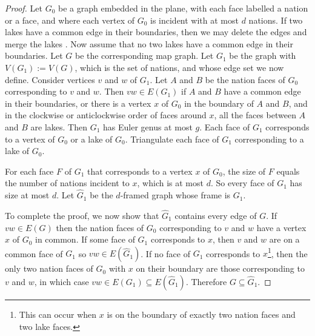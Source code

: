 \begin{proof}
  
Let $G_0$ be a graph embedded in the plane, with each face labelled a nation or a face, and where each vertex of $G_0$ is incident with at most $d$ nations. If two lakes have a common edge in their boundaries, then we may delete the edges and merge the lakes . Now assume that no two lakes have a common edge in their boundaries.
Let $G$ be the corresponding map graph.
Let $G_1$ be the graph with $V(G_1):=V(G)$, which is the set of nations, and whose edge set we now define.  Consider vertices $v$ and $w$ of $G_1$.
Let $A$ and $B$ be the nation faces of $G_0$ corresponding to $v$ and $w$.
Then $vw\in E(G_1)$ if $A$ and $B$ have a common edge in their boundaries,
or there is a vertex $x$ of $G_0$ in the boundary of $A$ and $B$, and in the clockwise or anticlockwise order of faces around $x$, all the faces between $A$ and $B$ are lakes.
 Then $G_1$ has Euler genus at most $g$.
Each face of $G_1$ corresponds to a vertex of $G_0$ or a lake of $G_0$.
Triangulate each face of $G_1$ corresponding to a lake of $G_0$.

For each face $F$ of $G_1$ that corresponds to a vertex $x$ of $G_0$, the size of $F$  equals the number of nations incident to $x$, which is at most $d$. So every face of $G_1$ has size at most $d$.  Let $\widehat{G}_1$ be the $d$-framed graph whose frame is $G_1$.   

To complete the proof, we now show that $\widehat{G}_1$ contains every edge of $G$.
If $vw\in E(G)$ then the nation faces of $G_0$ corresponding to $v$ and $w$ have a vertex $x$ of $G_0$ in common.   If some face of $G_1$ corresponds to $x$, then $v$ and $w$ are on a common face of $G_1$ so $vw\in E(\widehat{G}_1)$.  If no face of $G_1$ corresponds to $x$\footnote{This can occur when $x$ is on the boundary of exactly two nation faces and two lake faces.}, then the only two nation faces of $G_0$ with $x$ on their boundary are those corresponding to $v$ and $w$, in which case $vw\in E(G_1)\subseteq E(\widehat{G}_1)$.  Therefore $G\subseteq\widehat{G}_1$.
\end{proof}

